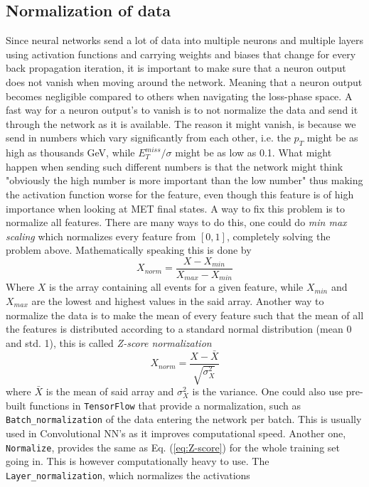 \documentclass[12pt, a4paper]{book}
\begin{document}
\subsection{Normalization of data}\label{sec:normie_NN}
Since neural networks send a lot of data into multiple neurons and multiple layers using activation functions and carrying weights and biases that change 
for every back propagation iteration, it is important to make sure that a neuron output does not vanish when moving around the network. Meaning that a neuron output becomes negligible compared to others when navigating the loss-phase space.
A fast way for a neuron output's to vanish is to not normalize the data and send it through the network as it is available. The reason it might vanish, is because we send in numbers which vary significantly from each other, i.e. the $p_{T}$ might be as high as thousands GeV, while 
$E_T^{miss}/\sigma$ might be as low as 0.1. What might happen when sending such different numbers is that the network might think "obviously the high number is more important than the low number" thus making the activation function worse for the feature, even though 
this feature is of high importance when looking at MET final states. A way to fix this problem is to normalize all features. There are many ways to do this, one could do \textit{min max scaling} which normalizes every feature from $[0,1]$, completely solving the problem above. 
Mathematically speaking this is done by
\begin{equation}\label{eq:minmax}
   X_{norm} = \frac{X - X_{min}}{X_{max}-X_{min}}
\end{equation}
Where $X$ is the array containing all events for a given feature, while $X_{min}$ and $X_{max}$ are the lowest and highest values in the said array. Another way to normalize the data is to make the mean of every feature such that the mean of all the features is distributed according 
to a standard normal distribution (mean 0 and std. 1), this is called \textit{Z-score normalization}
\begin{equation}\label{eq:Z-score}
   X_{norm} = \frac{X - \bar{X}}{\sqrt{\sigma_X^2}}
\end{equation}
where $\bar{X}$ is the mean of said array and $\sigma_X^2$ is the variance. One could also use pre-built functions in \verb|TensorFlow| that provide a normalization, such as \verb|Batch_normalization| of the data entering the network per batch. This is usually used 
in Convolutional NN's as it improves computational speed. Another one, \verb|Normalize|, provides the same as Eq. (\ref{eq:Z-score}) for the whole training set going in. This is however computationally heavy to use. The \verb|Layer_normalization|, which normalizes the activations 
\end{document}
